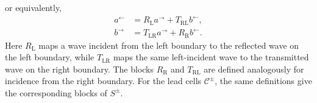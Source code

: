 \documentclass[11pt,fleqn]{article}
\theoremstyle{definition}
\theoremstyle{remark}
\begin{document}
or equivalently,
\begin{equation}
  \label{eq:scattering-blocks}
  \begin{aligned}
    a^\leftarrow &= R_\mathrm{L}a^\rightarrow + T_{\mathrm{RL}}b^\leftarrow,\\
    b^\rightarrow &= T_{\mathrm{LR}}a^\rightarrow + R_\mathrm{R}b^\leftarrow.
  \end{aligned}
  \end{equation}
Here \(R_\mathrm{L}\) maps a wave incident from the left boundary to the
reflected wave on the left boundary, while \(T_{\mathrm{LR}}\) maps the same
left-incident wave to the transmitted wave on the right boundary. The blocks
\(R_\mathrm{R}\) and \(T_{\mathrm{RL}}\) are defined analogously for incidence
from the right boundary. For the lead cells \(\mathcal C^\pm\), the same
definitions give the corresponding blocks of \(S^\pm\).
\end{document}
